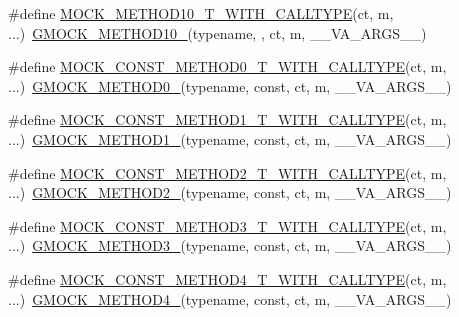 \begin{DoxyCompactItemize}
\item 
\#define \hyperlink{gmock-generated-function-mockers_8h_ae0460a593b7868a5573117032d6d2e3e}{M\+O\+C\+K\+\_\+\+M\+E\+T\+H\+O\+D10\+\_\+\+T\+\_\+\+W\+I\+T\+H\+\_\+\+C\+A\+L\+L\+T\+Y\+PE}(ct,  m, ...)~\hyperlink{gmock-generated-function-mockers_8h_a81a48223a8771de36ef92ac6d56f6e81}{G\+M\+O\+C\+K\+\_\+\+M\+E\+T\+H\+O\+D10\+\_\+}(typename, , ct, m, \+\_\+\+\_\+\+V\+A\+\_\+\+A\+R\+G\+S\+\_\+\+\_\+)
\item 
\#define \hyperlink{gmock-generated-function-mockers_8h_a4d7f87bf059071344e3a80c7fd1b9051}{M\+O\+C\+K\+\_\+\+C\+O\+N\+S\+T\+\_\+\+M\+E\+T\+H\+O\+D0\+\_\+\+T\+\_\+\+W\+I\+T\+H\+\_\+\+C\+A\+L\+L\+T\+Y\+PE}(ct,  m, ...)~\hyperlink{gmock-generated-function-mockers_8h_ae0d290ffa58d7c624b2e3487ba1252f4}{G\+M\+O\+C\+K\+\_\+\+M\+E\+T\+H\+O\+D0\+\_\+}(typename, const, ct, m, \+\_\+\+\_\+\+V\+A\+\_\+\+A\+R\+G\+S\+\_\+\+\_\+)
\item 
\#define \hyperlink{gmock-generated-function-mockers_8h_a73aa181fb48e360fd18f1c2b7d9073b0}{M\+O\+C\+K\+\_\+\+C\+O\+N\+S\+T\+\_\+\+M\+E\+T\+H\+O\+D1\+\_\+\+T\+\_\+\+W\+I\+T\+H\+\_\+\+C\+A\+L\+L\+T\+Y\+PE}(ct,  m, ...)~\hyperlink{gmock-generated-function-mockers_8h_a1bc0012d62440dda77208dabdf4925c9}{G\+M\+O\+C\+K\+\_\+\+M\+E\+T\+H\+O\+D1\+\_\+}(typename, const, ct, m, \+\_\+\+\_\+\+V\+A\+\_\+\+A\+R\+G\+S\+\_\+\+\_\+)
\item 
\#define \hyperlink{gmock-generated-function-mockers_8h_a74512829feca879a8e11731f0442d7b7}{M\+O\+C\+K\+\_\+\+C\+O\+N\+S\+T\+\_\+\+M\+E\+T\+H\+O\+D2\+\_\+\+T\+\_\+\+W\+I\+T\+H\+\_\+\+C\+A\+L\+L\+T\+Y\+PE}(ct,  m, ...)~\hyperlink{gmock-generated-function-mockers_8h_a885295ca6bebb15efb3fc786218c5d47}{G\+M\+O\+C\+K\+\_\+\+M\+E\+T\+H\+O\+D2\+\_\+}(typename, const, ct, m, \+\_\+\+\_\+\+V\+A\+\_\+\+A\+R\+G\+S\+\_\+\+\_\+)
\item 
\#define \hyperlink{gmock-generated-function-mockers_8h_ac19708f4d74bb11d9aeecb7c5b74dec8}{M\+O\+C\+K\+\_\+\+C\+O\+N\+S\+T\+\_\+\+M\+E\+T\+H\+O\+D3\+\_\+\+T\+\_\+\+W\+I\+T\+H\+\_\+\+C\+A\+L\+L\+T\+Y\+PE}(ct,  m, ...)~\hyperlink{gmock-generated-function-mockers_8h_af7c77ba511c631de02bb8c45a6ed3045}{G\+M\+O\+C\+K\+\_\+\+M\+E\+T\+H\+O\+D3\+\_\+}(typename, const, ct, m, \+\_\+\+\_\+\+V\+A\+\_\+\+A\+R\+G\+S\+\_\+\+\_\+)
\item 
\#define \hyperlink{gmock-generated-function-mockers_8h_acd1c5b5fca7c75ef5ed812f1e495a3f7}{M\+O\+C\+K\+\_\+\+C\+O\+N\+S\+T\+\_\+\+M\+E\+T\+H\+O\+D4\+\_\+\+T\+\_\+\+W\+I\+T\+H\+\_\+\+C\+A\+L\+L\+T\+Y\+PE}(ct,  m, ...)~\hyperlink{gmock-generated-function-mockers_8h_ab6430f2cfad9de4aca5258ea559294bb}{G\+M\+O\+C\+K\+\_\+\+M\+E\+T\+H\+O\+D4\+\_\+}(typename, const, ct, m, \+\_\+\+\_\+\+V\+A\+\_\+\+A\+R\+G\+S\+\_\+\+\_\+)

\end{DoxyCompactItemize}

